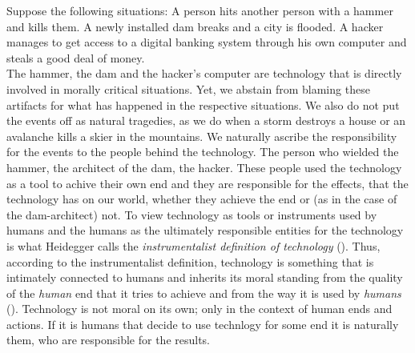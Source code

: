 \documentclass{article}
\begin{document}
Suppose the following situations: A person hits another person with a hammer and
kills them. A newly installed dam breaks and a city is flooded. A hacker manages
to get access to a digital banking system through his own computer and steals a
good deal of money.\\

The hammer, the dam and the hacker's computer are technology that is directly
involved in morally critical situations. Yet, we abstain from blaming these
artifacts for what has happened in the respective situations. We also do not put
the events off as natural tragedies, as we do when a storm destroys a house or
an avalanche kills a skier in the mountains. We naturally ascribe the
responsibility for the events to the people behind the technology.
The person who wielded the hammer, the architect of the dam, the hacker.
These people used the technology as a tool to achive their own end and they are
responsible for the effects, that the technology has on our world, whether they
achieve the end or (as in the case of the dam-architect) not.
To view technology as tools or instruments used by humans and the humans as the ultimately
responsible entities for the technology is what Heidegger calls the \textit{instrumentalist
definition of technology} (\cite{heidegger1977technology}). 
Thus, according to the instrumentalist definition, technology is something that
is intimately connected to humans and inherits its moral standing from the
quality of the \textit{human} end that it tries to achieve and from the way
it is used by \textit{humans} (\cite{johnson2006computer}). Technology is not moral on its own; only in the
context of human ends and actions. If it is humans that decide to use technlogy
for some end it is naturally them, who are responsible for the results.\\
\end{document}
